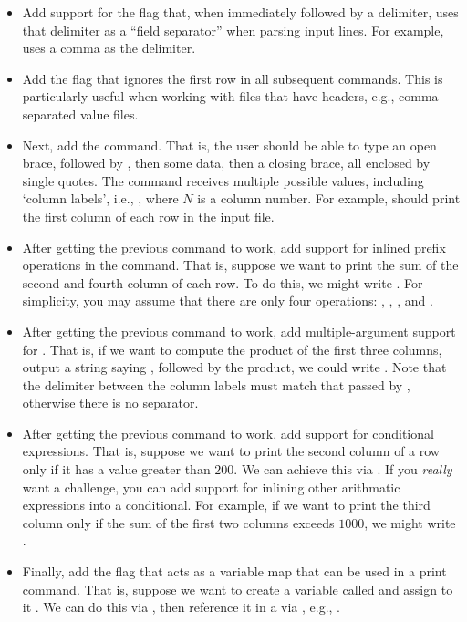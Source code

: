 \begin{itemize}
    \item Add support for the  flag that, when immediately followed by a delimiter, uses that delimiter as a ``field separator'' when parsing input lines. For example,  uses a comma as the delimiter.
    \item Add the  flag that ignores the first row in all subsequent commands. This is particularly useful when working with files that have headers, e.g., comma-separated value files.
    \item Next, add the  command. That is, the user should be able to type an open brace, followed by , then some data, then a closing brace, all enclosed by single quotes. The  command receives multiple possible values, including `column labels', i.e., , where $N$ is a column number. For example,  should print the first column of each row in the input file. 
    \item After getting the previous command to work, add support for inlined prefix operations in the  command. That is, suppose we want to print the sum of the second and fourth column of each row. To do this, we might write . For simplicity, you may assume that there are only four operations: , , , and . 
    \item After getting the previous command to work, add multiple-argument support for . That is, if we want to compute the product of the first three columns, output a string saying , followed by the product, we could write . Note that the delimiter between the column labels must match that passed by , otherwise there is no separator.
    \item After getting the previous command to work, add support for conditional expressions. That is, suppose we want to print the second column of a row only if it has a value greater than $200$. We can achieve this via . If you \textit{really} want a challenge, you can add support for inlining other arithmatic expressions into a conditional. For example, if we want to print the third column only if the sum of the first two columns exceeds $1000$, we might write .
    \item Finally, add the  flag that acts as a variable map that can be used in a print command. That is, suppose we want to create a variable called  and assign to it . We can do this via , then reference it in a  via \ttt{\$}, e.g., .
\end{itemize}

